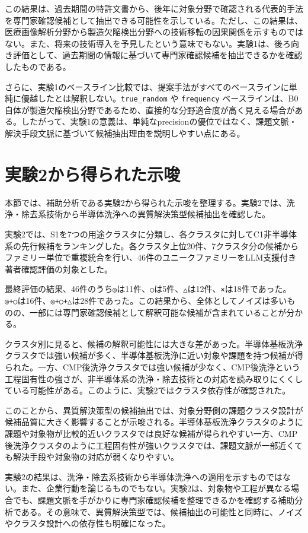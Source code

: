 この結果は、過去期間の特許文書から、後年に対象分野で確認される代表的手法を専門家確認候補として抽出できる可能性を示している。ただし、この結果は、医療画像解析分野から製造欠陥検出分野への技術移転の因果関係を示すものではない。また、将来の技術導入を予見したという意味でもない。実験1は、後ろ向き評価として、過去期間の情報に基づいて専門家確認候補を抽出できるかを確認したものである。

さらに、実験1のベースライン比較では、提案手法がすべてのベースラインに単純に優越したとは解釈しない。\texttt{true\_random} や \texttt{frequency} ベースラインは、B0自体が製造欠陥検出分野であるため、直接的な分野適合度が高く見える場合がある。したがって、実験1の意義は、単純なprecisionの優位ではなく、課題文脈・解決手段文脈に基づいて候補抽出理由を説明しやすい点にある。

\section{実験2から得られた示唆}

本節では、補助分析である実験2から得られた示唆を整理する。実験2では、洗浄・除去系技術から半導体洗浄への異質解決策型候補抽出を確認した。

実験2では、S1を7つの用途クラスタに分類し、各クラスタに対してC1非半導体系の先行候補をランキングした。各クラスタ上位20件、7クラスタ分の候補からファミリー単位で重複統合を行い、46件のユニークファミリーをLLM支援付き著者確認評価の対象とした。

最終評価の結果、46件のうち\texttt{◎}は11件、\texttt{○}は5件、\texttt{△}は12件、\texttt{×}は18件であった。\texttt{◎+○}は16件、\texttt{◎+○+△}は28件であった。この結果から、全体としてノイズは多いものの、一部には専門家確認候補として解釈可能な候補が含まれていることが分かる。

クラスタ別に見ると、候補の解釈可能性には大きな差があった。半導体基板洗浄クラスタでは強い候補が多く、半導体基板洗浄に近い対象や課題を持つ候補が得られた。一方、CMP後洗浄クラスタでは強い候補が少なく、CMP後洗浄という工程固有性の強さが、非半導体系の洗浄・除去技術との対応を読み取りにくくしている可能性がある。このように、実験2ではクラスタ依存性が確認された。

このことから、異質解決策型の候補抽出では、対象分野側の課題クラスタ設計が候補品質に大きく影響することが示唆される。半導体基板洗浄クラスタのように課題や対象物が比較的近いクラスタでは良好な候補が得られやすい一方、CMP後洗浄クラスタのように工程固有性が強いクラスタでは、課題文脈が一部近くても解決手段や対象物の対応が弱くなりやすい。

実験2の結果は、洗浄・除去系技術から半導体洗浄への適用を示すものではない。また、企業行動を論じるものでもない。実験2は、対象物や工程が異なる場合でも、課題文脈を手がかりに専門家確認候補を整理できるかを確認する補助分析である。その意味で、異質解決策型では、候補抽出の可能性と同時に、ノイズやクラスタ設計への依存性も明確になった。

